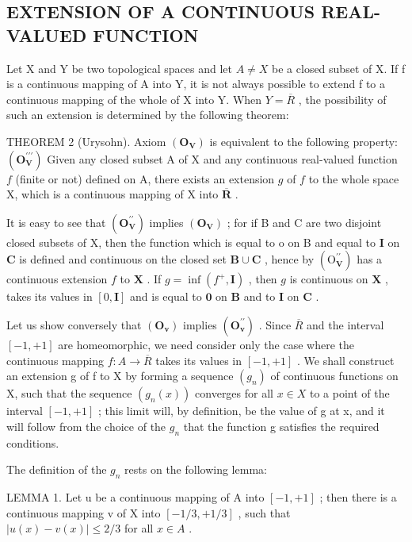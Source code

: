 \subsection{EXTENSION OF A CONTINUOUS REAL-VALUED FUNCTION}

Let X and Y be two topological spaces and let \(A \neq X\) be a closed subset of X. If f is a continuous mapping of A into Y, it is not always possible to extend f to a continuous mapping of the whole of X into Y. When \(Y = \overline{R}\) , the possibility of such an extension is determined by the following theorem:

THEOREM 2 (Urysohn). Axiom \((\mathbf{O}_{\mathbf{V}})\) is equivalent to the following property: \((\mathbf{O}_{\mathbf{V}}^{\prime \prime \prime})\) Given any closed subset A of X and any continuous real-valued function \(f\) (finite or not) defined on A, there exists an extension \(g\) of \(f\) to the whole space X, which is a continuous mapping of X into \(\overline{\mathbf{R}}\) .

It is easy to see that \((\mathbf{O}_{\mathbf{V}}^{\prime\prime})\) implies \((\mathbf{O}_{\mathbf{V}})\) ; for if B and C are two disjoint closed subsets of X, then the function which is equal to o on B and equal to \(\mathbf{I}\) on \(\mathbf{C}\) is defined and continuous on the closed set \(\mathbf{B} \cup \mathbf{C}\) , hence by \((\mathrm{O}_{\mathbf{V}}^{\prime \prime})\) has a continuous extension \(f\) to \(\mathbf{X}\) . If \(g = \inf (f^{+}, \mathbf{I})\) , then \(g\) is continuous on \(\mathbf{X}\) , takes its values in \([0, \mathbf{I}]\) and is equal to \(\mathbf{0}\) on \(\mathbf{B}\) and to \(\mathbf{I}\) on \(\mathbf{C}\) .

Let us show conversely that \((\mathbf{O}_{\mathbf{v}})\) implies \((\mathbf{O}_{\mathbf{v}}^{\prime\prime})\) . Since \(\overline{R}\) and the interval \([-1, +1]\) are homeomorphic, we need consider only the case where the continuous mapping \(f: A \to \overline{R}\) takes its values in \([-1, +1]\) . We shall construct an extension g of f to X by forming a sequence \((g_{n})\) of continuous functions on X, such that the sequence \((g_{n}(x))\) converges for all \(x \in X\) to a point of the interval \([-1, +1]\) ; this limit will, by definition, be the value of g at x, and it will follow from the choice of the \(g_{n}\) that the function g satisfies the required conditions.

The definition of the \(g_{n}\) rests on the following lemma:

LEMMA 1. Let u be a continuous mapping of A into \([-1, +1]\) ; then there is a continuous mapping v of X into \([-1/3, +1/3]\) , such that \(|u(x) - v(x)| \leqslant 2/3\) for all \(x \in A\) .

